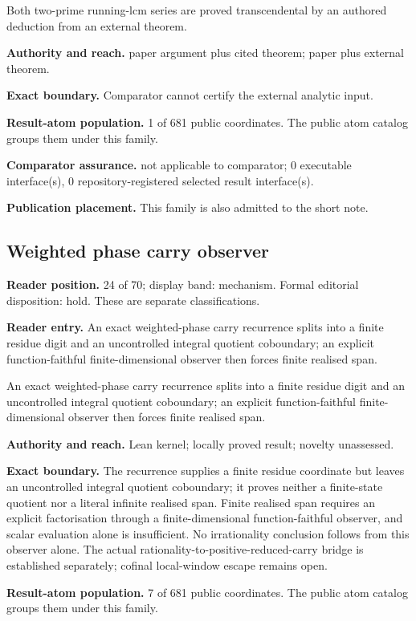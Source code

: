 \documentclass[11pt]{article}
\begin{document}
Both two-prime running-lcm series are proved transcendental by an authored deduction from an external theorem.

\textbf{Authority and reach.} paper argument plus cited theorem; paper plus external theorem.

\textbf{Exact boundary.} Comparator cannot certify the external analytic input.

\textbf{Result-atom population.} 1 of 681 public coordinates. The public atom catalog groups them under this family.

\textbf{Comparator assurance.} not applicable to comparator; 0 executable interface(s), 0 repository-registered selected result interface(s).

\textbf{Publication placement.} This family is also admitted to the short note.

\subsection{Weighted phase carry observer}
\textbf{Reader position.} 24 of 70; display band: mechanism.  Formal editorial disposition: hold.  These are separate classifications.

\textbf{Reader entry.} An exact weighted-phase carry recurrence splits into a finite residue digit and an uncontrolled integral quotient coboundary; an explicit function-faithful finite-dimensional observer then forces finite realised span.

An exact weighted-phase carry recurrence splits into a finite residue digit and an uncontrolled integral quotient coboundary; an explicit function-faithful finite-dimensional observer then forces finite realised span.

\textbf{Authority and reach.} Lean kernel; locally proved result; novelty unassessed.

\textbf{Exact boundary.} The recurrence supplies a finite residue coordinate but leaves an uncontrolled integral quotient coboundary; it proves neither a finite-state quotient nor a literal infinite realised span. Finite realised span requires an explicit factorisation through a finite-dimensional function-faithful observer, and scalar evaluation alone is insufficient. No irrationality conclusion follows from this observer alone. The actual rationality-to-positive-reduced-carry bridge is established separately; cofinal local-window escape remains open.

\textbf{Result-atom population.} 7 of 681 public coordinates. The public atom catalog groups them under this family.
\end{document}

